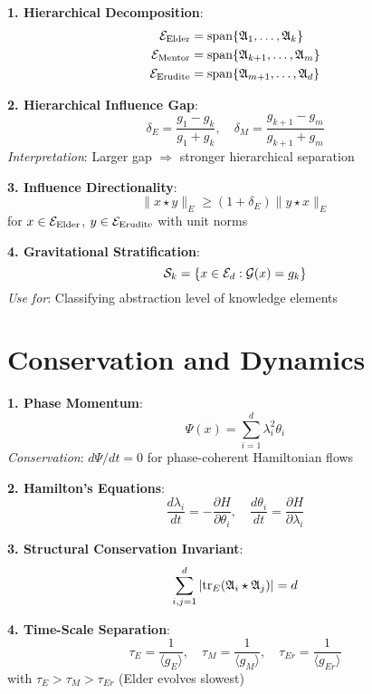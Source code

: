 \begin{tcolorbox}[colback=orange!5!white,colframe=orange!75!black,title=Hierarchy Formulas]

\textbf{1. Hierarchical Decomposition}:
\begin{align}
\mathcal{E}_{\text{Elder}} &= \mathrm{span}\{\mathfrak{A}_{1}, \ldots, \mathfrak{A}_{k}\} \\
\mathcal{E}_{\text{Mentor}} &= \mathrm{span}\{\mathfrak{A}_{k+1}, \ldots, \mathfrak{A}_{m}\} \\
\mathcal{E}_{\text{Erudite}} &= \mathrm{span}\{\mathfrak{A}_{m+1}, \ldots, \mathfrak{A}_{d}\}
\end{align}

\textbf{2. Hierarchical Influence Gap}:
$$\delta_E = \frac{g_1 - g_k}{g_1 + g_k}, \quad \delta_M = \frac{g_{k+1} - g_m}{g_{k+1} + g_m}$$
\textit{Interpretation}: Larger gap $\Rightarrow$ stronger hierarchical separation

\textbf{3. Influence Directionality}:
$$\|x \star y\|_E \geq (1 + \delta_E) \|y \star x\|_E$$
for $x \in \mathcal{E}_{\text{Elder}}$, $y \in \mathcal{E}_{\text{Erudite}}$ with unit norms

\textbf{4. Gravitational Stratification}:
$$\mathcal{S}_k = \{x \in \mathcal{E}_{d} : \mathcal{G}(x) = g_k\}$$
\textit{Use for}: Classifying abstraction level of knowledge elements

\end{tcolorbox}

\section{Conservation and Dynamics}

\begin{tcolorbox}[colback=purple!5!white,colframe=purple!75!black,title=Dynamical Formulas]

\textbf{1. Phase Momentum}:
$$\Psi(x) = \sum_{i=1}^{d} \lambda_i^2 \theta_i$$
\textit{Conservation}: $d\Psi/dt = 0$ for phase-coherent Hamiltonian flows

\textbf{2. Hamilton's Equations}:
$$\frac{d\lambda_i}{dt} = -\frac{\partial H}{\partial \theta_i}, \quad \frac{d\theta_i}{dt} = \frac{\partial H}{\partial \lambda_i}$$

\textbf{3. Structural Conservation Invariant}:
$$\sum_{i,j=1}^{d} |\mathrm{tr}_E(\mathfrak{A}_{i} \star \mathfrak{A}_{j})| = d$$

\textbf{4. Time-Scale Separation}:
$$\tau_E = \frac{1}{\langle g_E \rangle}, \quad \tau_M = \frac{1}{\langle g_M \rangle}, \quad \tau_{Er} = \frac{1}{\langle g_{Er} \rangle}$$
with $\tau_E > \tau_M > \tau_{Er}$ (Elder evolves slowest)

\end{tcolorbox}

